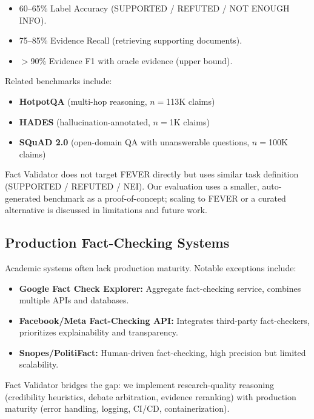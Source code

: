 \documentclass[12pt,a4paper,twoside]{article}
\begin{document}
\begin{itemize}
    \item 60--65\% Label Accuracy (SUPPORTED / REFUTED / NOT ENOUGH INFO).
    \item 75--85\% Evidence Recall (retrieving supporting documents).
    \item $>$90\% Evidence F1 with oracle evidence (upper bound).
\end{itemize}

Related benchmarks include:
\begin{itemize}
    \item \textbf{HotpotQA} (multi-hop reasoning, $n=$113K claims)
    \item \textbf{HADES} (hallucination-annotated, $n=$1K claims)
    \item \textbf{SQuAD 2.0} (open-domain QA with unanswerable questions, $n=$100K claims)
\end{itemize}

Fact Validator does not target FEVER directly but uses similar task definition (SUPPORTED / REFUTED / NEI). Our evaluation uses a smaller, auto-generated benchmark as a proof-of-concept; scaling to FEVER or a curated alternative is discussed in limitations and future work.

\subsection{Production Fact-Checking Systems}

Academic systems often lack production maturity. Notable exceptions include:

\begin{itemize}
    \item \textbf{Google Fact Check Explorer:} Aggregate fact-checking service, combines multiple APIs and databases.
    \item \textbf{Facebook/Meta Fact-Checking API:} Integrates third-party fact-checkers, prioritizes explainability and transparency.
    \item \textbf{Snopes/PolitiFact:} Human-driven fact-checking, high precision but limited scalability.
\end{itemize}

Fact Validator bridges the gap: we implement research-quality reasoning (credibility heuristics, debate arbitration, evidence reranking) with production maturity (error handling, logging, CI/CD, containerization).

\end{document}
